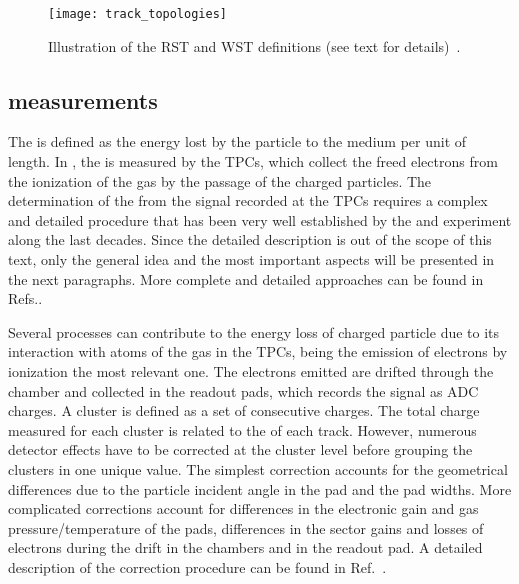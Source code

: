 \begin{figure}[!ht]
  \centering
  \texttt{[image: track\_topologies]}
  \caption{Illustration of the RST and WST definitions (see text for details)~\cite{MartinThesis}.}
  \label{fig:hadron:track:topologies}
\end{figure}


\subsection[\dedx measurements]{\boldmath \dedx measurements}
\label{sec:hadron:dedx:meas}

The \dedx is defined as the energy lost by the
particle to the medium per unit of length. 
In \NASixtyOne, the \dedx is measured by the TPCs, which collect the 
freed electrons from the ionization of the gas by the passage of the charged particles.
The determination of the \dedx from the signal recorded at the TPCs requires a complex and
detailed procedure that has been very well established by the \NAFortyNine and \NASixtyOne
experiment along the last decades. Since the detailed description 
is out of the scope of this text, only the general idea and the most important aspects
will be presented in the next paragraphs. More complete and detailed approaches
can be found in Refs.\cite{BlumBook,LeeuwenThesis,GaborVeresThesis}.

Several processes can contribute to the energy loss of charged particle due to
its interaction with atoms of the gas in the TPCs, being the emission of
electrons by ionization the most relevant one. The electrons emitted are
drifted through the chamber and collected in the readout pads, which records
the signal as ADC charges. A cluster is defined as a set of consecutive charges.
The total charge measured for each cluster is related to the \dedx of each track.
However, numerous detector effects have to be corrected at the cluster level before
grouping the clusters in one unique \dedx value. The simplest correction accounts for
the geometrical differences due to the particle incident angle in the pad and
the pad widths. More complicated corrections account for differences in the electronic
gain and gas pressure/temperature of the pads, differences in the sector gains and
losses of electrons during the drift in the chambers and in the readout pad.
A detailed description of the correction procedure can be found in Ref.~\cite{AntoniMThesis}.

